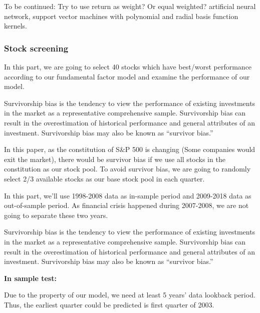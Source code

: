 \documentclass[]{article}
\begin{document}
To be continued: Try to use return as weight? Or equal weighted?
artificial neural network, support vector machines with polynomial and
radial basis function kernels.

\hypertarget{stock-screening}{%
\subsubsection{Stock screening}\label{stock-screening}}

In this part, we are going to select 40 stocks which have best/worst
performance according to our fundamental factor model and examine the
performance of our model.

Survivorship bias is the tendency to view the performance of existing
investments in the market as a representative comprehensive sample.
Survivorship bias can result in the overestimation of historical
performance and general attributes of an investment. Survivorship bias
may also be known as ``survivor bias.''

In this paper, as the constitution of S\&P 500 is changing (Some
companies would exit the market), there would be survivor bias if we use
all stocks in the constitution as our stock pool. To avoid survivor
bias, we are going to randomly select 2/3 available stocks as our base
stock pool in each quarter.

In this part, we'll use 1998-2008 data as in-sample period and 2009-2018
data as out-of-sample period. As financial crisis happened during
2007-2008, we are not going to separate these two years.

Survivorship bias is the tendency to view the performance of existing
investments in the market as a representative comprehensive sample.
Survivorship bias can result in the overestimation of historical
performance and general attributes of an investment. Survivorship bias
may also be known as ``survivor bias.''

\textbf{In sample test:}

Due to the property of our model, we need at least 5 years' data
lookback period. Thus, the earliest quarter could be predicted is first
quarter of 2003.
\end{document}
